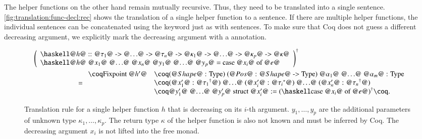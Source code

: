 The helper functions on the other hand remain mutually recursive.
Thus, they need to be translated into a single  sentence.
\autoref{fig:translation:func-decl:rec} shows the translation of a single helper function to a  sentence.
If there are multiple helper functions, the individual  sentences can be concatenated using the  keyword just as with  sentences.
To make sure that Coq does not guess a different decreasing argument, we explicitly mark the decreasing argument with a  annotation.

\begin{figure}[H]
  \begin{align*}
    &\toCoq{\left(\begin{array}{l}
      \haskellM{@$h$@ :: @$\tau_1$@ -> @$\ldots$@ -> @$\tau_n$@ -> @$\kappa_1$@ -> @$\ldots$@ -> @$\kappa_p$@ -> @$\kappa$@} \\
      \haskellM{@$h$@ @$x_1$@ @$\ldots$@ @$x_n$@ @$y_1$@ @$\ldots$@ @$y_p$@ = case @$x_i$@ of @$e$@}
    \end{array}\right)}
    \\
    &\qquad\qquad\qquad=
    \begin{array}{ll}
      \coqM{Fixpoint @$h'$@}
        &\coqM{(@$\Shape$@ : Type) (@$\Pos$@ : @$\Shape$@ -> Type) {@$\alpha_1$@ @$\ldots$@ @$\alpha_m$@ : Type}} \\
        &\coqM{(@$x_1'$@ : @$\toCoqX{\tau_1}$@) @$\ldots$@ (@$x_i'$@ : @$\toCoqTX{\tau_i}$@) @$\ldots$@ (@$x_n'$@ : @$\toCoqX{\tau_n}$@)} \\
        &\coqM{@$y_1'$@ @$\ldots$@ @$y_p'$@ {struct @$x_i'$@} :=}\;\toCoq{(\haskellM{case @$x_i$@ of @$e$@})}\coqM{.}  \\
    \end{array}
  \end{align*}
  \caption{
    Translation rule for a single helper function $h$ that is decreasing on its $i$-th argument.
    $y_1, \ldots, y_p$ are the additional parameters of unknown type $\kappa_1, \ldots, \kappa_p$.
    The return type $\kappa$ of the helper function is also not known and must be inferred by Coq.
    The decreasing argument $x_i$ is not lifted into the free monad.
  }
  \label{fig:translation:func-decl:rec}
\end{figure}

